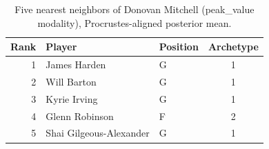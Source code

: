 \begin{table}[htbp]
  \centering\small
  \begin{tabular}{rllc}
    \toprule
    Rank & Player & Position & Archetype \\
    \midrule
    1 & James Harden & G & 1 \\
    2 & Will Barton & G & 1 \\
    3 & Kyrie Irving & G & 1 \\
    4 & Glenn Robinson & F & 2 \\
    5 & Shai Gilgeous-Alexander & G & 1 \\
    \bottomrule
  \end{tabular}
  \caption{Five nearest neighbors of Donovan Mitchell (peak_value modality), Procrustes-aligned posterior mean.}
  \label{tab:Donovan_Mitchell_neighbors_peak_value}
\end{table}

